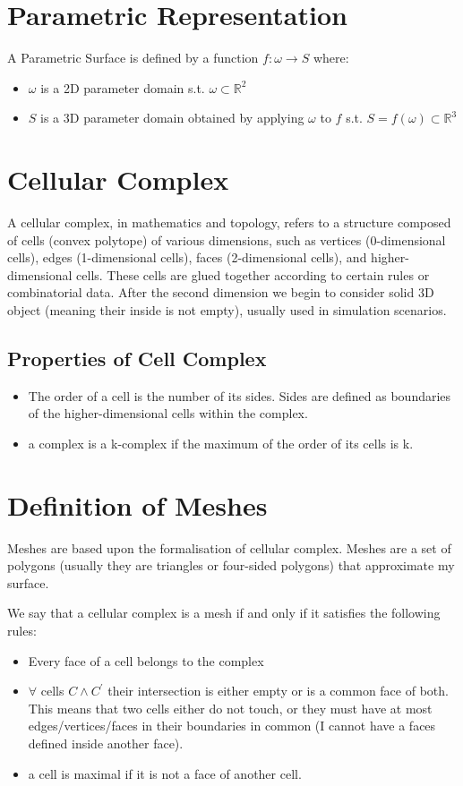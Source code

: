 \section{Parametric Representation}
A Parametric Surface is defined by a function $f: \omega \rightarrow S$ where:
\begin{itemize}
    \item $\omega$ is a 2D parameter domain s.t. $\omega \subset \mathbb{R}^{2}$
    \item $S$ is a 3D parameter domain obtained by applying $\omega$ to $f$ s.t. $S = f(\omega) \subset \mathbb{R}^{3}$
\end{itemize}

\section{Cellular Complex}
A cellular complex, in mathematics and topology, refers to a structure composed of cells (convex polytope) of various dimensions, such as vertices (0-dimensional cells), edges (1-dimensional cells), faces (2-dimensional cells), and higher-dimensional cells. These cells are glued together according to certain rules or combinatorial data. After the second dimension we begin to consider solid 3D object (meaning their inside is not empty), usually used in simulation scenarios.

\subsection{Properties of Cell Complex}
\begin{itemize}
    \item The order of a cell is the number of its sides. Sides are defined as boundaries of the higher-dimensional cells within the complex.
    \item a complex is a k-complex if the maximum of the order of its cells is k.
\end{itemize}


\section{Definition of Meshes}
Meshes are based upon the formalisation of cellular complex. Meshes are a set of polygons (usually they are triangles or four-sided polygons) that approximate my surface.\par
We say that a cellular complex is a mesh if and only if it satisfies the following rules:
\begin{itemize}
    \item Every face of a cell belongs to the complex
    \item $\forall$ cells $C \land C^{'}$ their intersection is either empty or is a common face of both. This means that two cells either do not touch, or they must have at most edges/vertices/faces in their boundaries in common (I cannot have a faces defined inside another face). 
    \item a cell is maximal if it is not a face of another cell.
\end{itemize}

